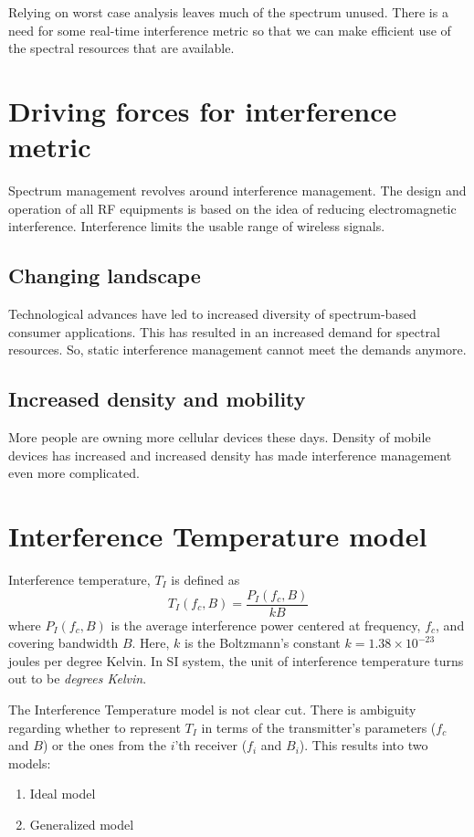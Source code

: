 \documentclass[12pt]{article}
\begin{document}
Relying on worst case analysis leaves much of the spectrum unused. There is a need for some real-time interference metric so that we can make efficient use of the spectral resources that are available.

\section{Driving forces for interference metric}

Spectrum management revolves around interference management\cite{kolodzy2006}. The design and operation of all RF equipments is based on the idea of reducing electromagnetic interference. Interference limits the usable range of wireless signals.

\subsection*{Changing landscape}

Technological advances have led to increased diversity of spectrum-based consumer applications. This has resulted in an increased demand for spectral resources. So, static interference management cannot meet the demands anymore.

\subsection*{Increased density and mobility}

More people are owning more cellular devices these days. Density of mobile devices has increased and increased density has made interference management even more complicated.

\section{Interference Temperature model}
Interference temperature, $T_I$ is defined\cite{clancy2006, kolodzy2006} as
\begin{equation*} 
    T_I(f_c , B) = \frac{P_I(f_c , B)}{kB}
\end{equation*}
where $P_I(f_c,B)$ is the average interference power centered at frequency, $f_c$, and covering bandwidth
$B$. Here, $k$ is the Boltzmann's constant $k = 1.38 \times 10^{-23} $ joules per degree Kelvin. In SI system, the unit of interference temperature turns out to be \emph{degrees Kelvin}.

The Interference Temperature model\cite{clancy2006} is not clear cut. There is ambiguity regarding whether to represent $T_I$ in terms of the transmitter's parameters ($f_c$ and $B$) or the ones from the $i$'th receiver ($f_i$ and $B_i$).
This results into two models\cite{clancy2006}:
\begin{enumerate}
    \item Ideal model
    \item Generalized model
\end{enumerate}
\end{document}
